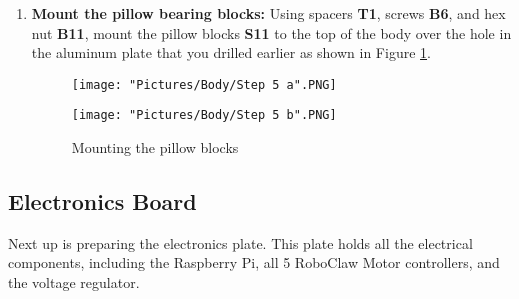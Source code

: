 \documentclass[12pt]{article}
\begin{document}
\begin{enumerate}
\item \textbf{Mount the pillow bearing blocks:} Using spacers \textbf{T1}, screws \textbf{B6}, and hex nut \textbf{B11}, mount the pillow blocks \textbf{S11} to the top of the body over the hole in the aluminum plate that you drilled earlier as shown in Figure \ref{mount pillow blocks}.

\begin{figure}[H]
  \centering
  \begin{minipage}[b]{0.30\textwidth}
    \texttt{[image: "Pictures/Body/Step 5 a".PNG]}
  \end{minipage}
  \hfill
  \begin{minipage}[b]{0.55\textwidth}
    \texttt{[image: "Pictures/Body/Step 5 b".PNG]}
  \end{minipage}
  \caption{Mounting the pillow blocks}
  \label{mount pillow blocks}
\end{figure}


\end{enumerate}

\subsection{Electronics Board}

Next up is preparing the electronics plate. This plate holds all the electrical components, including the Raspberry Pi, all 5 RoboClaw Motor controllers, and the voltage regulator.
\end{document}
